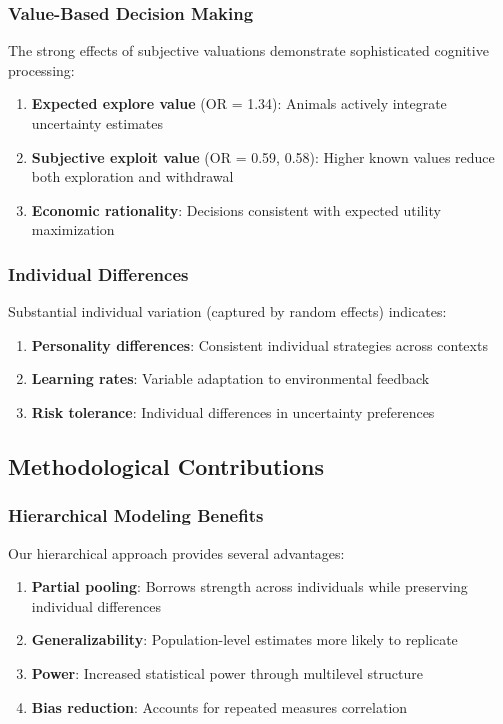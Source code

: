 \documentclass[11pt]{article}
\begin{document}
\subsubsection{Value-Based Decision Making}
The strong effects of subjective valuations demonstrate sophisticated cognitive processing:
\begin{enumerate}
    \item \textbf{Expected explore value} (OR = 1.34): Animals actively integrate uncertainty estimates
    \item \textbf{Subjective exploit value} (OR = 0.59, 0.58): Higher known values reduce both exploration and withdrawal
    \item \textbf{Economic rationality}: Decisions consistent with expected utility maximization
\end{enumerate}

\subsubsection{Individual Differences}
Substantial individual variation (captured by random effects) indicates:
\begin{enumerate}
    \item \textbf{Personality differences}: Consistent individual strategies across contexts
    \item \textbf{Learning rates}: Variable adaptation to environmental feedback
    \item \textbf{Risk tolerance}: Individual differences in uncertainty preferences
\end{enumerate}

\subsection{Methodological Contributions}

\subsubsection{Hierarchical Modeling Benefits}
Our hierarchical approach provides several advantages:
\begin{enumerate}
    \item \textbf{Partial pooling}: Borrows strength across individuals while preserving individual differences
    \item \textbf{Generalizability}: Population-level estimates more likely to replicate
    \item \textbf{Power}: Increased statistical power through multilevel structure
    \item \textbf{Bias reduction}: Accounts for repeated measures correlation
\end{enumerate}
\end{document}
